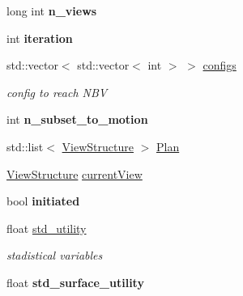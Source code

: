\begin{DoxyCompactItemize}
\item 
long int {\bfseries n\+\_\+views}\hypertarget{classReconstructor3D_af7694b142f1ee0188b1c210f5ad91771}{}\label{classReconstructor3D_af7694b142f1ee0188b1c210f5ad91771}

\item 
int {\bfseries iteration}\hypertarget{classReconstructor3D_ad6b3d3579381d6b919d3480dc544aa68}{}\label{classReconstructor3D_ad6b3d3579381d6b919d3480dc544aa68}

\item 
std\+::vector$<$ std\+::vector$<$ int $>$ $>$ \hyperlink{classReconstructor3D_aecbe4257f53cc243125a8c370265e8de}{configs}\hypertarget{classReconstructor3D_aecbe4257f53cc243125a8c370265e8de}{}\label{classReconstructor3D_aecbe4257f53cc243125a8c370265e8de}

\begin{DoxyCompactList}\small\item\em config to reach N\+BV \end{DoxyCompactList}\item 
int {\bfseries n\+\_\+subset\+\_\+to\+\_\+motion}\hypertarget{classReconstructor3D_af15e3bc3feca4c1cf3c1db6c275ab2b8}{}\label{classReconstructor3D_af15e3bc3feca4c1cf3c1db6c275ab2b8}

\item 
std\+::list$<$ \hyperlink{classViewStructure}{View\+Structure} $>$ \hyperlink{classReconstructor3D_a8afd09b3f07435ef93b11147b0d92c6f}{Plan}
\item 
\hyperlink{classViewStructure}{View\+Structure} \hyperlink{classReconstructor3D_a29b49aed1badf557f570f835d8683532}{current\+View}
\item 
bool {\bfseries initiated}\hypertarget{classReconstructor3D_a2e701750963834a8452e3a7bd75a09c0}{}\label{classReconstructor3D_a2e701750963834a8452e3a7bd75a09c0}

\item 
float \hyperlink{classReconstructor3D_a430c767504d2bdcd445929456889f8e9}{std\+\_\+utility}\hypertarget{classReconstructor3D_a430c767504d2bdcd445929456889f8e9}{}\label{classReconstructor3D_a430c767504d2bdcd445929456889f8e9}

\begin{DoxyCompactList}\small\item\em stadistical variables \end{DoxyCompactList}\item 
float {\bfseries std\+\_\+surface\+\_\+utility}\hypertarget{classReconstructor3D_a460a06b85c058fbe3b385bfc08343764}{}\label{classReconstructor3D_a460a06b85c058fbe3b385bfc08343764}


\end{DoxyCompactItemize}
